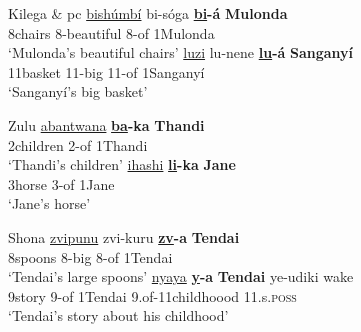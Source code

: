 \documentclass[output=paper
,modfonts
,nonflat]{langsci/langscibook}
\begin{document}
\begin{exe}
	\ex Kilega \citep{Kinyalolo1991} \& pc \label{ex-carstens:9}
	\xlist
	\ex 
	\gll \underline{bishúmbí}   bi-sóga        \textbf{\underline{bi}-á}   \textbf{Mulonda} \\
	8chairs       8-beautiful     8-of    1Mulonda\\
	\glt `Mulonda’s beautiful chairs'  	
	\ex 
	\gll \underline{luzi}               lu-nene   \textbf{\underline{lu}-á}    \textbf{Sanganyí}\\
	11basket   11-big    11-of      1Sanganyí\\
	\glt `Sanganyí’s big basket'
	\endxlist
\end{exe}
\begin{exe}
	\ex Zulu \label{ex-carstens:10}
	\xlist
	\ex 
	\gll \underline{abantwana} \textbf{\underline{ba}{}-ka}   \textbf{Thandi} \\
	2children     2-of        1Thandi\\
	\glt `Thandi’s children'  	
	\ex 
	\gll \underline{ihashi}   \textbf{\underline{li}{}-ka}  \textbf{Jane}\\
	3horse 3-of     1Jane\\
	\glt `Jane’s horse'
	\endxlist
\end{exe}
\begin{exe}
	\ex Shona \label{ex-carstens:11}
	\xlist
	\ex 
	\gll \underline{zvipunu}   zvi-kuru \textbf{\underline{zv}{}-a}     \textbf{Tendai} \\
	8spoons   8-big       8-of    1Tendai\\
	\glt `Tendai’s large spoons'  	
	\ex 
	\gll \underline{nyaya}   \textbf{\underline{y}{}-a}     \textbf{Tendai}   ye-udiki             wake\\
	9story   9-of    1Tendai   9.of-11childhoood     11.s.\textsc{poss}\\
	\glt `Tendai's story about his childhood'
	\endxlist
\end{exe}
\end{document}
